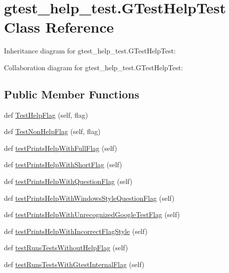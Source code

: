 \hypertarget{classgtest__help__test_1_1_g_test_help_test}{}\section{gtest\+\_\+help\+\_\+test.\+G\+Test\+Help\+Test Class Reference}
\label{classgtest__help__test_1_1_g_test_help_test}


Inheritance diagram for gtest\+\_\+help\+\_\+test.\+G\+Test\+Help\+Test\+:


Collaboration diagram for gtest\+\_\+help\+\_\+test.\+G\+Test\+Help\+Test\+:
\subsection*{Public Member Functions}
\begin{DoxyCompactItemize}
\item 
def \hyperlink{classgtest__help__test_1_1_g_test_help_test_a26cc1a64bd67278252ebfcd0ac0dca0c}{Test\+Help\+Flag} (self, flag)
\item 
def \hyperlink{classgtest__help__test_1_1_g_test_help_test_a03ffa91ecf6193ed2ed80b53933112ab}{Test\+Non\+Help\+Flag} (self, flag)
\item 
def \hyperlink{classgtest__help__test_1_1_g_test_help_test_ad91b46ad4506ff52b337b63f6b6c2ad1}{test\+Prints\+Help\+With\+Full\+Flag} (self)
\item 
def \hyperlink{classgtest__help__test_1_1_g_test_help_test_a3dd96058d093a89350769b4e2cc36563}{test\+Prints\+Help\+With\+Short\+Flag} (self)
\item 
def \hyperlink{classgtest__help__test_1_1_g_test_help_test_aafd4d1857c2538c8b1f7cc5a5d1e38b4}{test\+Prints\+Help\+With\+Question\+Flag} (self)
\item 
def \hyperlink{classgtest__help__test_1_1_g_test_help_test_a7be99cd30193e2eecf79f9d65f561afc}{test\+Prints\+Help\+With\+Windows\+Style\+Question\+Flag} (self)
\item 
def \hyperlink{classgtest__help__test_1_1_g_test_help_test_a701abb8f34df726b9129d7654cb32066}{test\+Prints\+Help\+With\+Unrecognized\+Google\+Test\+Flag} (self)
\item 
def \hyperlink{classgtest__help__test_1_1_g_test_help_test_ab8d379bbb0da7403ced599f4ee498728}{test\+Prints\+Help\+With\+Incorrect\+Flag\+Style} (self)
\item 
def \hyperlink{classgtest__help__test_1_1_g_test_help_test_ae7831f92e8e3763c07afb908915b3d20}{test\+Runs\+Tests\+Without\+Help\+Flag} (self)
\item 
def \hyperlink{classgtest__help__test_1_1_g_test_help_test_a0ebec2e3154d22a63e362d2196f9c638}{test\+Runs\+Tests\+With\+Gtest\+Internal\+Flag} (self)
\end{DoxyCompactItemize}


